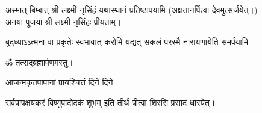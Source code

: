 \begin{center}
\medskip

अस्मात् बिम्बात् श्री-लक्ष्मी-नृसिंहं यथास्थानं प्रतिष्ठापयामि (अक्षतानर्पित्वा देवमुत्सर्जयेत्।)\\
अनया पूजया श्री-लक्ष्मी-नृसिंहः प्रीयताम्।\medskip

{बुद्‌ध्याऽऽत्मना वा प्रकृतेः स्वभावात्}
{करोमि यद्यत् सकलं परस्मै}
{नारायणायेति समर्पयामि}


ॐ तत्सद्ब्रह्मार्पणमस्तु।\medskip

{आजन्मकृतपापानां प्रायश्चित्तं दिने दिने}

{सर्वपापक्षयकरं विष्णुपादोदकं शुभम्}
 इति तीर्थं पीत्वा शिरसि प्रसादं धारयेत्।

\end{center}


\closesection

